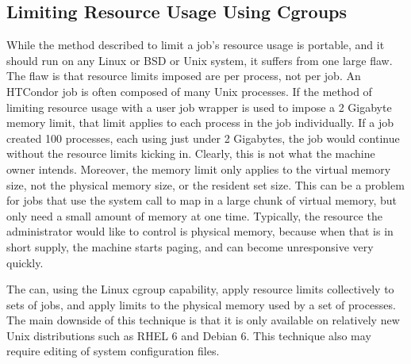 \subsection{\label{sec:Resource-Limits-Cgroup}Limiting Resource Usage Using Cgroups} 

While the method described to limit a job's resource usage is portable,
and it should run on any Linux or BSD or Unix system, 
it suffers from one large flaw.  
The flaw is that resource limits imposed are per process, not per job.
An HTCondor job is often composed of many Unix processes.  
If the method of limiting resource usage with a user job wrapper
is used to impose a 2 Gigabyte memory limit, 
that limit applies to each process in the job individually.  
If a job created 100 processes, each using just under 2 Gigabytes, 
the job would continue without the resource limits kicking in.
Clearly, this is not what the machine owner intends.  
Moreover,
the memory limit only applies to the virtual memory size, 
not the physical memory size, or the resident set size.  
This can be a problem for jobs
that use the  system call to map in a large chunk of virtual memory,
but only need a small amount of memory at one time.
Typically, the resource the
administrator would like to control is physical memory, 
because when that is in short supply, 
the machine starts paging, and can become unresponsive very quickly.

The  can, using the Linux cgroup capability,
apply resource limits collectively to sets of jobs, 
and apply limits to the physical memory used by a set of processes.  
The main downside of this technique is that it is only 
available on relatively new Unix distributions such as RHEL 6 and Debian 6.
This technique also may require editing of system configuration files.

